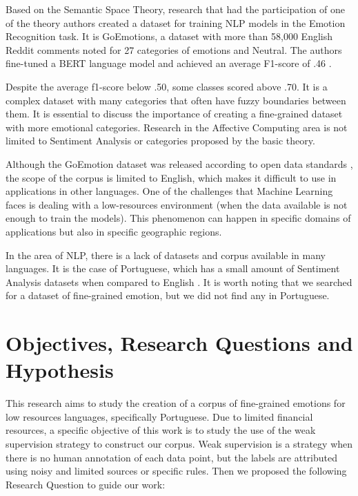 \documentclass[12pt]{article}
\begin{document}
Based on the Semantic Space Theory, research that had the participation of one of the theory authors created a dataset for training NLP models in the Emotion Recognition task. It is GoEmotions, a dataset with more than 58,000 English Reddit comments noted for 27 categories of emotions and Neutral. The authors fine-tuned a BERT language model and achieved an average F1-score of .46 \cite{Demszky2020}.

Despite the average f1-score below .50, some classes scored above .70. It is a complex dataset with many categories that often have fuzzy boundaries between them. It is essential to discuss the importance of creating a fine-grained dataset with more emotional categories. Research in the Affective Computing area is not limited to Sentiment Analysis or categories proposed by the basic theory.

Although the GoEmotion dataset was released according to open data standards \cite{Demszky2020}, the scope of the corpus is limited to English, which makes it difficult to use in applications in other languages. One of the challenges that Machine Learning faces is dealing with a low-resources environment (when the data available is not enough to train the models). This phenomenon can happen in specific domains of applications but also in specific geographic regions.

In the area of NLP, there is a lack of datasets and corpus available in many languages. It is the case of Portuguese, which has a small amount of Sentiment Analysis datasets when compared to English \cite{Pereira2021}. It is worth noting that we searched for a dataset of fine-grained emotion, but we did not find any in Portuguese.

\section{Objectives, Research Questions and Hypothesis}
\label{sec:objectives}

This research aims to study the creation of a corpus of fine-grained emotions for low resources languages, specifically Portuguese. Due to limited financial resources, a specific objective of this work is to study the use of the weak supervision strategy to construct our corpus. Weak supervision is a strategy when there is no human annotation of each data point, but the labels are attributed using noisy and limited sources or specific rules. Then we proposed the following Research Question to guide our work:
\end{document}
